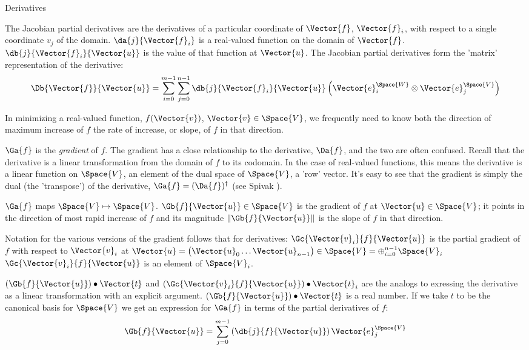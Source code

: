 \begin{plSection}{Derivatives}
\begin{itemize}
The Jacobian partial derivatives are the derivatives of
a particular coordinate of $\Vector{f}$, $\Vector{f}_i$, with respect to
a single coordinate $v_j$ of the domain.
$\da{j}{\Vector{f}_i}$ is a real-valued function on the domain of $\Vector{f}$.
$\db{j}{\Vector{f}_i}{\Vector{u}}$ is the value of that function at $\Vector{u}$.
The Jacobian partial derivatives form the 'matrix' representation of the derivative:
\begin{equation}
\Db{\Vector{f}}{\Vector{u}} =
\sum_{i=0}^{m-1}
\sum_{j=0}^{n-1}
\db{j}{\Vector{f}_i}{\Vector{u}} \left( \Vector{e}_i^{\Space{W}} \otimes \Vector{e}_j^{\Space{V}} \right)
\end{equation}

\end{itemize}

In minimizing a real-valued function, $f(\Vector{v})$, $\Vector{v} \in \Space{V}$,
we frequently need to know both the direction of maximum increase of $f$
the rate of increase, or slope, of $f$ in that direction.

$\Ga{f}$ is the \textit{gradient} of $f$.
The gradient has a close relationship to the derivative, $\Da{f}$,
and the two are often confused.
Recall that the derivative is a linear transformation
from the domain of $f$ to its codomain.
In the case of real-valued functions,
this means the derivative is a linear function on $\Space{V}$,
an element of the dual space of $\Space{V}$, a 'row' vector.
It's easy to see that the gradient is simply the dual (the 'transpose')
of the derivative, $\Ga{f} = (\Da{f})^{\dagger}$
(see Spivak \cite[p.~96, ex.~4-18]{Spivak:1965:CalculusOnManifolds}).

$\Ga{f}$ maps $\Space{V} \mapsto \Space{V}$.
$\Gb{f}{\Vector{u}} \in \Space{V}$ is the gradient of $f$ at $\Vector{u} \in \Space{V}$;
it points in the direction of most rapid increase of
$f$ and its magnitude $\| \Gb{f}{\Vector{u}} \|$ is the
slope of $f$ in that direction.

Notation for the various versions of the gradient
follows that for derivatives:
$\Gc{\Vector{v}_i}{f}{\Vector{u}}$ is the partial gradient of $f$ with respect to $\Vector{v}_i$ at
$\Vector{u} = \left( \Vector{u}_0 \ldots \Vector{u}_{n-1} \right) \in \Space{V} = \oplus_{i=0}^{n-1} \Space{V}_i$
$\Gc{\Vector{v}_i}{f}{\Vector{u}}$ is an element of $\Space{V}_i$.

$(\Gb{f}{\Vector{u}}) \bullet  \Vector{t}$
and
$(\Gc{\Vector{v}_i}{f}{\Vector{u}}) \bullet \Vector{t}_i$
are the analogs to exressing the derivative as a linear transformation
with an explicit argument.
$(\Gb{f}{\Vector{u}}) \bullet  \Vector{t}$ is a real number.
If we take $t$ to be the canonical basis for $\Space{V}$
we get an expression for $\Ga{f}$ in terms of the partial derivatives of $f$:
\begin{equation}
\label{eq:gradient-from-partials}
\Gb{f}{\Vector{u}} = \sum_{j=0}^{m-1} \left( \db{j}{f}{\Vector{u}} \right) \Vector{e}_j^{\Space{V}}
\end{equation}


\end{plSection}
